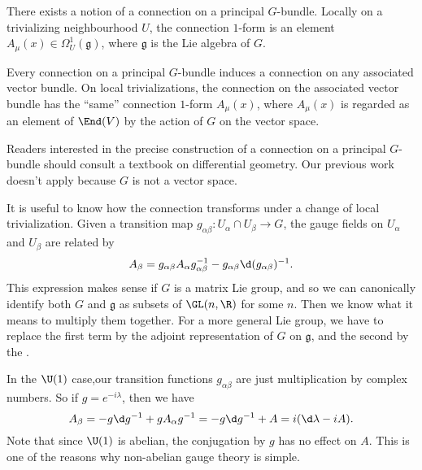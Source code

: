 \documentclass[a4paper]{article}
\begin{document}
\begin{thm}
  There exists a notion of a connection on a principal $G$-bundle. Locally on a trivializing neighbourhood $U$, the connection $1$-form is an element $A_\mu(x) \in \Omega^1_U(\mathfrak{g})$, where $\mathfrak{g}$ is the Lie algebra of $G$.

  Every connection on a principal $G$-bundle induces a connection on any associated vector bundle. On local trivializations, the connection on the associated vector bundle has the ``same'' connection $1$-form $A_\mu(x)$, where $A_\mu(x)$ is regarded as an element of $\End(V)$ by the action of $G$ on the vector space.
\end{thm}

Readers interested in the precise construction of a connection on a principal $G$-bundle should consult a textbook on differential geometry. Our previous work doesn't apply because $G$ is not a vector space.

It is useful to know how the connection transforms under a change of local trivialization. Given a transition map $g_{\alpha\beta}: U_\alpha \cap U_\beta \to G$, the gauge fields on $U_\alpha$ and $U_\beta$ are related by
\[
  A_\beta = g_{\alpha \beta} A_\alpha g_{\alpha\beta}^{-1} - g_{\alpha\beta} \d (g_{\alpha\beta})^{-1}.
\]
This expression makes sense if $G$ is a matrix Lie group, and so we can canonically identify both $G$ and $\mathfrak{g}$ as subsets of $\GL(n, \R)$ for some $n$. Then we know what it means to multiply them together. For a more general Lie group, we have to replace the first term by the adjoint representation of $G$ on $\mathfrak{g}$, and the second by the .

\begin{eg}
  In the $\U(1)$ case,our transition functions $g_{\alpha\beta}$ are just multiplication by complex numbers. So if $g = e^{-i\lambda}$, then we have
  \[
    A_{\beta} = -g \d g^{-1} + g A_\alpha g^{-1} = -g \d g^{-1} + A = i(\d \lambda - iA).
  \]
  Note that since $\U(1)$ is abelian, the conjugation by $g$ has no effect on $A$. This is one of the reasons why non-abelian gauge theory is simple.
\end{eg}
\end{document}
